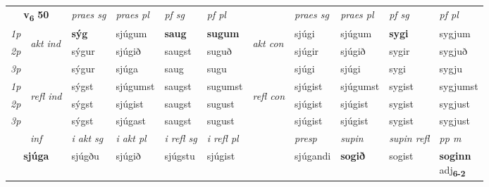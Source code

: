 \noindent
\begin{tabular}{lllllllllll} \toprule
\multicolumn{2}{c}{\textbf{v{\textsubscript{6}}} \Large{\textbf{50}}}  &  \textit{praes sg}  & \textit{praes pl}  &\textit{ pf sg} & \textit{pf pl} &  &  \textit{praes sg}  & \textit{praes pl}  & \textit{pf sg} & \textit{pf pl } \\*
	\cmidrule{3-6} \cmidrule{8-11}
 {\textit{1p}} & \multirow{3}{*}{\begin{turn}{90}\textit{akt ind}\end{turn}} & \textbf{sýg} & sjúgum & \textbf{saug} & \textbf{sugum} & \multirow{3}{*}{\begin{turn}{90}\textit{akt con}\end{turn}} &sjúgi & sjúgum & \textbf{sygi} & sygjum\\*
 {\textit{2p}} &  &  sýgur  & sjúgið & saugst & suguð & & sjúgir & sjúgið & sygir & sygjuð \\*
{\textit{3p}} &  & sýgur & sjúga & saug & sugu & & sjúgi & sjúgi& sygi & sygju \\*
\cmidrule{3-6} \cmidrule{8-11}
 {\textit{1p}} & \multirow{3}{*}{\begin{turn}{90}\textit{refl ind}\end{turn}}  & sýgst & sjúgumst & saugst & sugumst & \multirow{3}{*}{\begin{turn}{90}\textit{refl con}\end{turn}}  &sjúgist & sjúgumst & sygist & sygjumst \\*
 {\textit{2p}} &  & sýgst & sjúgist & saugst & sugust & &sjúgist & sjúgist & sygist & sygjust \\*
 {\textit{3p}}  & & sýgst & sjúgast & saugst & sugust & & sjúgist & sjúgist& sygist & sygjust \\*
\cmidrule{3-6} \cmidrule{8-11}

   \multicolumn{2}{c}{\textit{inf}}  & \textit{i akt sg} & \textit{i akt pl} & \textit{i refl sg} & \textit{i refl pl} && \textit{presp} & \textit{supin} & \textit{supin refl} & \textit{pp m} \\*
  \multicolumn{2}{c}{\textbf{sjúga}} & sjúgðu  & sjúgið & sjúgstu & sjúgist && sjúgandi &  \textbf{sogið} & sogist & \specialcell{\textbf{soginn} \\ adj\textbf{\textsubscript{6-2}}} \\*
\end{tabular}

